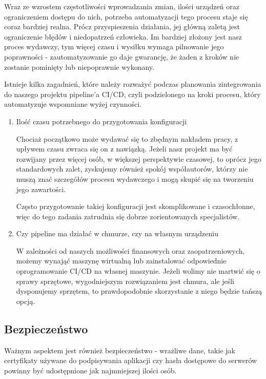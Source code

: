Wraz ze wzrostem częstotliwości wprowadzania zmian, ilości urządzeń oraz ograniczeniem dostępu do nich,
potrzeba automatyzacji tego procesu staje się coraz bardziej realna.
Prócz przyspieszenia działania, jej główną zaletą jest ograniczenie błędów i niedopatrzeń człowieka.
Im bardziej złożony jest nasz proces wydawczy, tym więcej czasu i wysiłku wymaga pilnowanie jego poprawności -
zautomatyzowanie go daje gwarancję, że żaden z kroków nie zostanie pominięty lub niepoprawnie wykonany.

Istnieje kilka zagadnień, które należy rozważyć podczas planowania zintegrowania do naszego projektu pipeline'a CI/CD,
czyli podzielonego na kroki procesu, który automatyzuje wspomniane wyżej czynności.
\begin{enumerate}
    \item Ilość czasu potrzebnego do przygotowania konfiguracji

    Chociaż początkowo może wydawać się to zbędnym nakładem pracy, z upływem czasu zwraca się on z nawiązką.
    Jeżeli nasz projekt ma być rozwijany przez więcej osób, w większej perspektywie czasowej, 
    to oprócz jego standardowych zalet, zyskujemy również spokój współautorów, 
    którzy nie muszą znać szczegółów procesu wydawczego i mogą skupić się na tworzeniu jego zawartości.

    Często przygotowanie takiej konfiguracji jest skomplikowane i czasochłonne, 
    więc do tego zadania zatrudnia się dobrze zorientowanych specjalistów.

    \item Czy pipeline ma działać w chmurze, czy na własnym urządzeniu

    W zależności od naszych możliwości finansowych oraz zaopatrzeniowych, możemy wynająć maszynę wirtualną
    lub zainstalować odpowiednie oprogramowanie CI/CD na własnej maszynie. 
    Jeżeli wolimy nie martwić się o sprawy sprzętowe, wygodniejszym rozwiązaniem jest chmura,
    ale jeśli dysponujemy sprzętem, to prawdopodobnie skorzystanie z niego będzie tańszą opcją. 
\end{enumerate}


\subsection[pipelineSafety]{Bezpieczeństwo}
Ważnym aspektem jest również bezpieczeństwo - wrażliwe dane, takie jak certyfikaty używane do podpisywania aplikacji czy
hasła dostępowe do serwerów powinny być udostępnione jak najmniejszej ilości osób.

